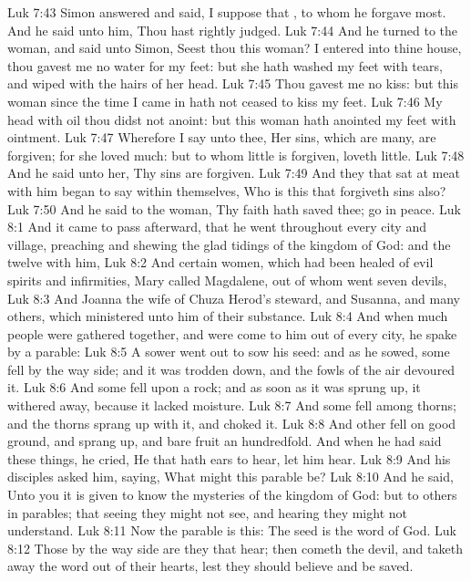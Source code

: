\vs Luk 7:43 Simon answered and said, I suppose that , to whom he forgave most. And he said unto him, Thou hast rightly judged.
\vs Luk 7:44 And he turned to the woman, and said unto Simon, Seest thou this woman? I entered into thine house, thou gavest me no water for my feet: but she hath washed my feet with tears, and wiped  with the hairs of her head.
\vs Luk 7:45 Thou gavest me no kiss: but this woman since the time I came in hath not ceased to kiss my feet.
\vs Luk 7:46 My head with oil thou didst not anoint: but this woman hath anointed my feet with ointment.
\vs Luk 7:47 Wherefore I say unto thee, Her sins, which are many, are forgiven; for she loved much: but to whom little is forgiven,  loveth little.
\vs Luk 7:48 And he said unto her, Thy sins are forgiven.
\vs Luk 7:49 And they that sat at meat with him began to say within themselves, Who is this that forgiveth sins also?
\vs Luk 7:50 And he said to the woman, Thy faith hath saved thee; go in peace.
\vs Luk 8:1 And it came to pass afterward, that he went throughout every city and village, preaching and shewing the glad tidings of the kingdom of God: and the twelve  with him,
\vs Luk 8:2 And certain women, which had been healed of evil spirits and infirmities, Mary called Magdalene, out of whom went seven devils,
\vs Luk 8:3 And Joanna the wife of Chuza Herod's steward, and Susanna, and many others, which ministered unto him of their substance.
\vs Luk 8:4 And when much people were gathered together, and were come to him out of every city, he spake by a parable:
\vs Luk 8:5 A sower went out to sow his seed: and as he sowed, some fell by the way side; and it was trodden down, and the fowls of the air devoured it.
\vs Luk 8:6 And some fell upon a rock; and as soon as it was sprung up, it withered away, because it lacked moisture.
\vs Luk 8:7 And some fell among thorns; and the thorns sprang up with it, and choked it.
\vs Luk 8:8 And other fell on good ground, and sprang up, and bare fruit an hundredfold. And when he had said these things, he cried, He that hath ears to hear, let him hear.
\vs Luk 8:9 And his disciples asked him, saying, What might this parable be?
\vs Luk 8:10 And he said, Unto you it is given to know the mysteries of the kingdom of God: but to others in parables; that seeing they might not see, and hearing they might not understand.
\vs Luk 8:11 Now the parable is this: The seed is the word of God.
\vs Luk 8:12 Those by the way side are they that hear; then cometh the devil, and taketh away the word out of their hearts, lest they should believe and be saved.
